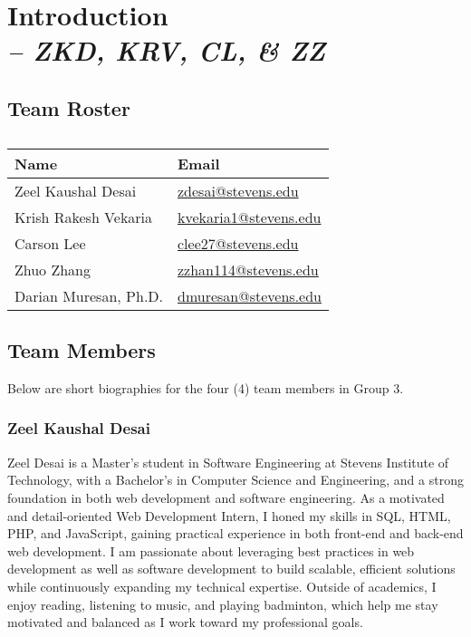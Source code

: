 \chapter{Introduction \\
\small{\textit{-- ZKD, KRV, CL, \& ZZ}}
\label{Chapter::Introduction}}

\section{Team Roster}

\begin{longtable}{|p{6cm}|p{6cm}|}
\caption{  \label{Table::TeamRoster}}\\
    
    \hline
    \textbf{Name} & \textbf{Email} \\
    \hline 
    \endhead

Zeel Kaushal Desai & \href{mailto:zdesai@stevens.edu}{zdesai@stevens.edu} \\ \hline

Krish Rakesh Vekaria & 
\href{mailto:kvekaria1@stevens.edu}{kvekaria1@stevens.edu} \\ \hline

Carson Lee & \href{mailto:clee27@stevens.edu}{clee27@stevens.edu} \\ \hline

Zhuo Zhang &
\href{mailto:zzhan114@stevens.edu}{zzhan114@stevens.edu} \\ \hline

Darian Muresan, Ph.D. & \href{mailto:dmuresan@stevens.edu}{dmuresan@stevens.edu} \\ \hline

\end{longtable}

\section{Team Members}
Below are short biographies for the four (4) team members in Group 3.

\subsection{Zeel Kaushal Desai}
Zeel Desai is a Master’s student in Software Engineering at Stevens Institute of Technology, with a Bachelor’s in Computer Science and Engineering, and a strong foundation in both web development and software engineering. As a motivated and detail-oriented Web Development Intern, I honed my skills in SQL, HTML, PHP, and JavaScript, gaining practical experience in both front-end and back-end web development. I am passionate about leveraging best practices in web development as well as software development to build scalable, efficient solutions while continuously expanding my technical expertise. Outside of academics, I enjoy reading, listening to music, and playing badminton, which help me stay motivated and balanced as I work toward my professional goals.

